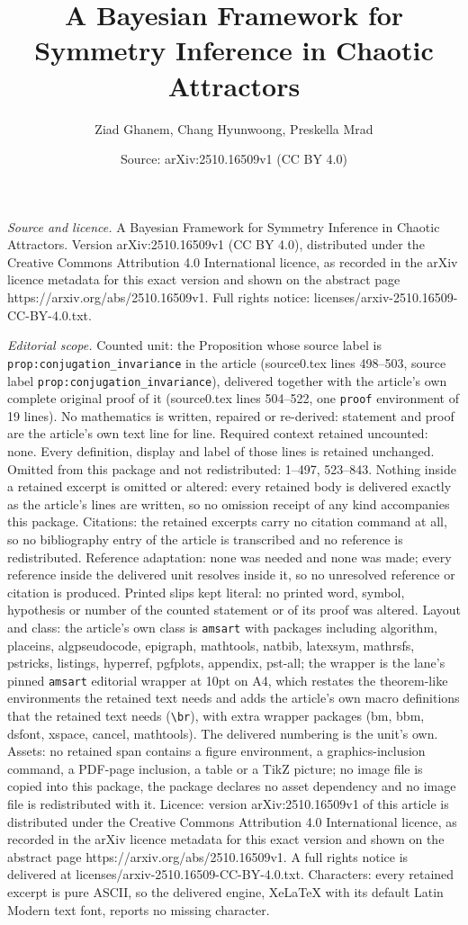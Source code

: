 \documentclass[10pt,a4paper]{amsart}
\title[A Bayesian Framework for Symmetry Inference in Chaotic Attra]{A Bayesian Framework for Symmetry Inference in Chaotic Attractors}
\author{Ziad Ghanem, Chang Hyunwoong, Preskella Mrad}
\date{Source: arXiv:2510.16509v1 (CC BY 4.0)}
\begin{document}
\maketitle

\noindent\emph{Source and licence.} A Bayesian Framework for Symmetry Inference in Chaotic Attractors. Version arXiv:2510.16509v1 (CC BY 4.0), distributed under the Creative Commons Attribution 4.0 International licence, as recorded in the arXiv licence metadata for this exact version and shown on the abstract page https://arxiv.org/abs/2510.16509v1. Full rights notice: licenses/arxiv-2510.16509-CC-BY-4.0.txt.\par\smallskip

\noindent\textit{Editorial scope.} Counted unit: the Proposition whose source label is \texttt{prop:conjugation\_invariance} in the article (source0.tex lines 498--503, source label \texttt{prop:conjugation\_invariance}), delivered together with the article's own complete original proof of it (source0.tex lines 504--522, one \texttt{proof} environment of 19 lines). No mathematics is written, repaired or re-derived: statement and proof are the article's own text line for line. Required context retained uncounted: none. Every definition, display and label of those lines is retained unchanged. Omitted from this package and not redistributed: 1--497, 523--843. Nothing inside a retained excerpt is omitted or altered: every retained body is delivered exactly as the article's lines are written, so no omission receipt of any kind accompanies this package. Citations: the retained excerpts carry no citation command at all, so no bibliography entry of the article is transcribed and no reference is redistributed. Reference adaptation: none was needed and none was made; every reference inside the delivered unit resolves inside it, so no unresolved reference or citation is produced. Printed slips kept literal: no printed word, symbol, hypothesis or number of the counted statement or of its proof was altered. Layout and class: the article's own class is \texttt{amsart} with packages including algorithm, placeins, algpseudocode, epigraph, mathtools, natbib, latexsym, mathrsfs, pstricks, listings, hyperref, pgfplots, appendix, pst-all; the wrapper is the lane's pinned \texttt{amsart} editorial wrapper at 10pt on A4, which restates the theorem-like environments the retained text needs and adds the article's own macro definitions that the retained text needs (\texttt{\textbackslash br}), with extra wrapper packages (bm, bbm, dsfont, xspace, cancel, mathtools). The delivered numbering is the unit's own. Assets: no retained span contains a figure environment, a graphics-inclusion command, a PDF-page inclusion, a table or a TikZ picture; no image file is copied into this package, the package declares no asset dependency and no image file is redistributed with it. Licence: version arXiv:2510.16509v1 of this article is distributed under the Creative Commons Attribution 4.0 International licence, as recorded in the arXiv licence metadata for this exact version and shown on the abstract page https://arxiv.org/abs/2510.16509v1. A full rights notice is delivered at licenses/arxiv-2510.16509-CC-BY-4.0.txt. Characters: every retained excerpt is pure ASCII, so the delivered engine, XeLaTeX with its default Latin Modern text font, reports no missing character.
\end{document}
